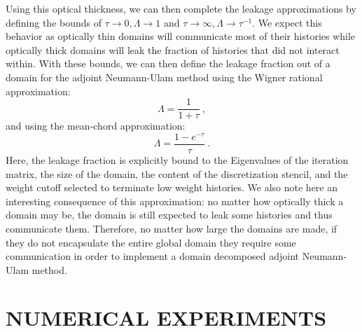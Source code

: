 \documentclass{mc2013}
\begin{document}
Using this optical thickness, we can then complete the leakage
approximations by defining the bounds of $\tau \rightarrow 0, \Lambda
\rightarrow 1$ and $\tau \rightarrow \infty, \Lambda \rightarrow
\tau^{-1}$. We expect this behavior as optically thin domains will
communicate most of their histories while optically thick domains will
leak the fraction of histories that did not interact within. With
these bounds, we can then define the leakage fraction out of a domain
for the adjoint Neumann-Ulam method using the Wigner rational
approximation:
\begin{equation}
  \Lambda = \frac{1}{1+\tau}\:,
  \label{eq:wigner_domain_leakage}
\end{equation}
and using the mean-chord approximation:
\begin{equation}
  \Lambda = \frac{1-e^{-\tau}}{\tau}\:.
  \label{eq:mean_chord_domain_leakage}
\end{equation}
Here, the leakage fraction is explicitly bound to the Eigenvalues of
the iteration matrix, the size of the domain, the content of the
discretization stencil, and the weight cutoff selected to terminate
low weight histories.  We also note here an interesting consequence of
this approximation: no matter how optically thick a domain may be, the
domain is still expected to leak some histories and thus communicate
them. Therefore, no matter how large the domains are made, if they do
not encapsulate the entire global domain they require some
communication in order to implement a domain decomposed adjoint
Neumann-Ulam method.

\section{NUMERICAL EXPERIMENTS}
\label{sec:numerical_experiments}
\end{document}
